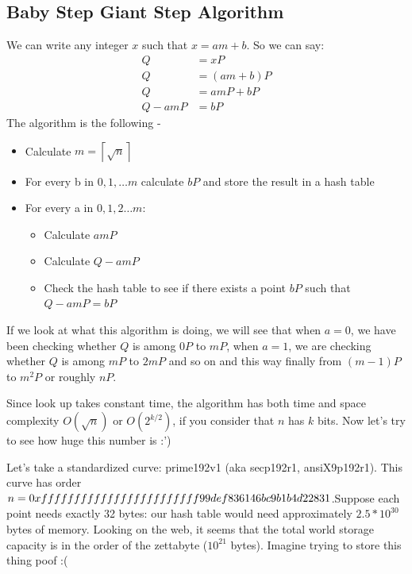 \documentclass{article}
\begin{document}
\subsection{Baby Step Giant Step Algorithm}
We can write any integer $x$ such that $x=am+b$. So we can say:
\begin{align*}
  Q & = xP \\
  Q & = (am + b) P \\
  Q & = am P + b P \\
  Q - am P & = b P
\end{align*}
The algorithm is the following - 
\begin{itemize}
    \item Calculate $m = \left\lceil{\sqrt{n}}\right\rceil$
    \item For every b in $0,1,\dots m$ calculate $bP$ and store the result in a hash table
    \item For every a in $0,1,2\dots m$:
    \begin{itemize}
        \item Calculate $amP$
        \item Calculate $Q-amP$
        \item Check the hash table to see if there exists a point $bP$ such that $Q-amP=bP$
    \end{itemize}
\end{itemize}
If we look at what this algorithm is doing, we will see that when $a=0$, we have been checking whether $Q$ is among $0P$ to $mP$, when $a=1$, we are checking whether $Q$ is among $mP$ to $2mP$ and so on and this way finally from $(m-1)P$ to $m^2P$ or roughly $nP$.

Since look up takes constant time, the algorithm has both time and space complexity $O(\sqrt{n})$ or $O(2^{k/2})$, if you consider that $n$ has $k$ bits. Now let's try to see how huge this number is :')

Let's take a standardized curve: prime192v1 (aka secp192r1, ansiX9p192r1). This curve has order $n=0xffffffffffffffff ffffffff99def836146bc9b1\\b4d22831$.Suppose each point needs exactly 32 bytes: our hash table would need approximately $2.5*10^{30}$ bytes of memory. Looking on the web, it seems that the total world storage capacity is in the order of the zettabyte ($10^{21}$ bytes). Imagine trying to store this thing poof :(
\end{document}
